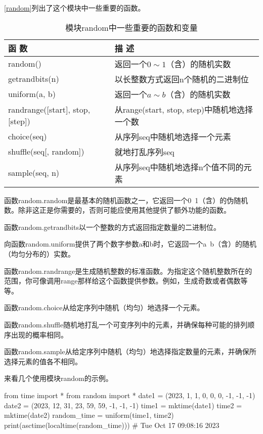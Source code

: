 \autoref{random}列出了这个模块中一些重要的函数。

\begin{table}
    \centering
    \caption{模块random中一些重要的函数和变量}
    \label{random}
    \begin{tabular}{ll}
        \hline
        函 数                              & 描 述                                \\
        \hline
        random()                         & 返回一个$0\sim 1$（含）的随机实数                    \\
        getrandbits(n)                   & 以长整数方式返回n个随机的二进制位                  \\
        uniform(a, b)                    & 返回一个$a\sim b$（含）的随机实数                    \\
        randrange([start], stop, [step]) & 从range(start, stop, step)中随机地选择一个数 \\
        choice(seq)                      & 从序列seq中随机地选择一个元素                   \\
        shuffle(seq[, random])           & 就地打乱序列seq                          \\
        sample(seq, n)                   & 从序列seq中随机地选择n个值不同的元素               \\
        \hline
    \end{tabular}
\end{table}
函数random.random是最基本的随机函数之一，它返回一个0~1（含）的伪随机数。除非这正是你需要的，否则可能应使用其他提供了额外功能的函数。

函数random.getrandbits以一个整数的方式返回指定数量的二进制位。

向函数random.uniform提供了两个数字参数a和b时，它返回一个a~b（含）的随机（均匀分布的）实数。

函数random.randrange是生成随机整数的标准函数。为指定这个随机整数所在的范围，你可像调用range那样给这个函数提供参数。例如，生成奇数或者偶数等等。

函数random.choice从给定序列中随机（均匀）地选择一个元素。

函数random.shuffle随机地打乱一个可变序列中的元素，并确保每种可能的排列顺序出现的概率相同。

函数random.sample从给定序列中随机（均匀）地选择指定数量的元素，并确保所选择元素的值各不相同。

来看几个使用模块random的示例。
\begin{tcolorbox}[title=随机选择一个时间]
\begin{pyc}
from time import *
from random import *
date1 = (2023, 1, 1, 0, 0, 0, -1, -1, -1)
date2 = (2023, 12, 31, 23, 59, 59, -1, -1, -1)
time1 = mktime(date1)
time2 = mktime(date2)
random_time = uniform(time1, time2)
print(asctime(localtime(random_time)))
# Tue Oct 17 09:08:16 2023
\end{pyc}
\end{tcolorbox}

